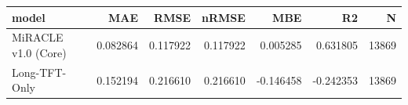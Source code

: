 \begin{tabular}{lrrrrrr}
\toprule
model & MAE & RMSE & nRMSE & MBE & R2 & N \\
\midrule
MiRACLE v1.0 (Core) & 0.082864 & 0.117922 & 0.117922 & 0.005285 & 0.631805 & 13869 \\
Long-TFT-Only & 0.152194 & 0.216610 & 0.216610 & -0.146458 & -0.242353 & 13869 \\
\bottomrule
\end{tabular}
